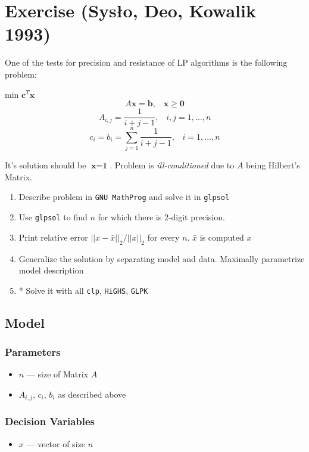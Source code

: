 \section{Exercise (Sysło, Deo, Kowalik 1993)}
One of the tests for precision and resistance of LP algorithms is the following problem: 
\begin{center}
    min $\textbf{c}^T \textbf{x}$ 
    $$A\textbf{x} = \textbf{b}\textrm{,}\quad \textbf{x} \geqslant \textbf{0}$$
    $$A_{i,j} = \frac{1}{i+j-1}\textrm{,}\quad i, j = 1,\dots,n$$ 
    $$c_i = b_i = \sum_{j=1}^{n} \frac{1}{i+j-1}\textrm{,}\quad i=1,\dots,n$$
\end{center}
It's solution should be $\textbf{x} = \textbf{1}$. Problem is \textit{ill-conditioned} due to $A$ being Hilbert's Matrix.
\begin{enumerate}
    \item Describe problem in \texttt{GNU MathProg} and solve it in \texttt{glpsol} \done
    \item Use \texttt{glpsol} to find $n$ for which there is 2-digit precision. \done
    \item Print relative error $||x-\bar{x}||_2 / ||x||_2$ for every $n$. $\bar{x}$ is computed $x$ \done
    \item Generalize the solution by separating model and data. Maximally parametrize model description \done
    \item * Solve it with all \texttt{clp}, \texttt{HiGHS}, \texttt{GLPK} \neverdone
\end{enumerate}

\subsection{Model}
\subsubsection*{Parameters}
\begin{itemize}
    \item $n$ --- size of Matrix $A$
    \item $A_{i,j}$\textrm{,} $c_i$\textrm{,} $b_i $ as described above
\end{itemize}
\subsubsection*{Decision Variables}
\begin{itemize}
    \item $x$ --- vector of size $n$
\end{itemize}
